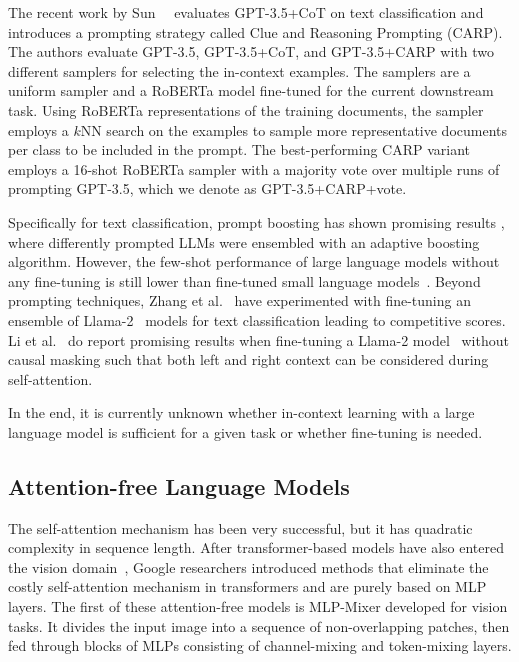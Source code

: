 \documentclass[acmsmall,nonacm]{acmart}
\begin{document}
The recent work by Sun~\etal~\cite{carp} evaluates GPT-3.5+CoT on text classification and introduces a prompting strategy called Clue and Reasoning Prompting (CARP).
The authors evaluate GPT-3.5, GPT-3.5+CoT, and GPT-3.5+CARP with two different samplers for selecting the in-context examples.
The samplers are a uniform sampler and a RoBERTa model fine-tuned for the current downstream task.
Using RoBERTa representations of the training documents, the sampler employs a $k$NN search on the examples to sample more representative documents per class to be included in the prompt.
The best-performing CARP variant employs a 16-shot RoBERTa sampler with a majority vote over multiple runs of prompting GPT-3.5, which we denote as GPT-3.5+CARP+vote.

Specifically for text classification, prompt boosting has shown promising results
\cite{pmlr-v202-hou23b}, where differently prompted LLMs were ensembled with an adaptive boosting algorithm. 
However, the few-shot performance of large language models without any fine-tuning is still lower than fine-tuned small language models~\cite{edwards2024language}.
Beyond prompting techniques,
Zhang et al.~\cite{DBLP:journals/corr/abs-2402-07470-pushing-the-limit} have experimented with fine-tuning an ensemble of Llama-2~\cite{touvronLlamaOpenFoundation2023} models for text classification leading to competitive scores.
Li et al.~\cite{li2023label} do report promising results when fine-tuning a Llama-2 model~\cite{touvronLlamaOpenFoundation2023} without causal masking such that both left and right context can be considered during self-attention. 

In the end, it is currently unknown whether in-context learning with a large language model is sufficient for a given task or whether fine-tuning is needed. 

\subsection{Attention-free Language Models}
The self-attention mechanism has been very successful, but it has quadratic complexity in sequence length.
After transformer-based models have also entered the vision domain~\cite{visiontransformer}, Google researchers introduced methods that eliminate the costly self-attention mechanism in transformers and are purely based on MLP layers. 
The first of these attention-free models is MLP-Mixer \cite{tolstikhin2021mlp} developed for vision tasks. 
It divides the input image into a sequence of non-overlapping patches, then fed through blocks of MLPs consisting of channel-mixing and token-mixing layers.
\end{document}
